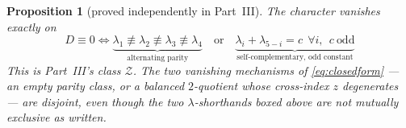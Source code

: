 \documentclass[11pt,a4paper]{article}
\newtheorem{proposition}{Proposition}
\begin{document}
\begin{proposition}[proved independently in Part~III]\label{cor:Z}
The character vanishes exactly on
\begin{equation}\label{eq:zerolocus}
\boxed{\;
D\equiv0
\iff
\underbrace{\lambda_1\not\equiv\lambda_2\not\equiv\lambda_3\not\equiv\lambda_4}_{\text{alternating parity}}
\quad\text{or}\quad
\underbrace{\lambda_i+\lambda_{5-i}=c\ \ \forall i,\ \ c\ \text{odd}}_{\text{self-complementary, odd constant}}\;}
\end{equation}
This is Part~III's class $\mathcal Z$. The two vanishing mechanisms of
\eqref{eq:closedform} --- an empty parity class, or a balanced $2$-quotient whose cross-index
$z$ degenerates --- are disjoint, even though the two $\lambda$-shorthands boxed above are not
mutually exclusive as written.
\end{proposition}
\end{document}
